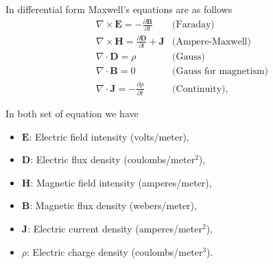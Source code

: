 In differential form Maxwell's equations are as follows
\begin{align}
&\nabla\times \mathbf{E} = - \frac{\partial \mathbf{B}}{\partial t} &\mbox{(Faraday)} \label{eq:diff_Faraday}\\
&\nabla\times \mathbf{H} =  \frac{\partial \mathbf{D}}{\partial t} + \mathbf{J} &\mbox{(Ampere-Maxwell)} \label{eq:diff_Ampere}\\
&\nabla\cdot \mathbf{D} = \rho &\mbox{(Gauss)} \label{eq:diff_Gauss}\\
&\nabla\cdot \mathbf{B} = 0 &\mbox{(Gauss for magnetism)} \label{eq:diff_Gauss2}\\
&\nabla\cdot \mathbf{J} = -\frac{\partial \rho}{\partial t} &\mbox{(Continuity)}, \label{eq:diff_cont}
\end{align}

In both set of equation we have
\begin{itemize}
\item $\mathbf{E}$: Electric field intensity (volts/meter),
\item $\mathbf{D}$: Electric flux density (coulombs/meter$^2$),
\item $\mathbf{H}$: Magnetic field intensity (amperes/meter),
\item $\mathbf{B}$: Magnetic flux density (webers/meter),
\item $\mathbf{J}$: Electric current density (amperes/meter$^2$),
\item $\rho$: Electric charge density (coulombs/meter$^3$).
\end{itemize}

